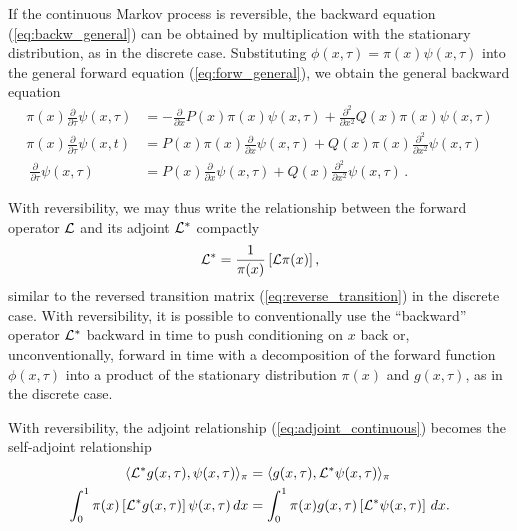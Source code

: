 \documentclass[preprint]{elsarticle}
\begin{document}
If the continuous Markov process is reversible, the backward equation (\ref{eq:backw_general}) can be obtained by multiplication with the stationary distribution, as in the discrete case. Substituting $\phi(x,\tau)=\pi(x)\psi(x,\tau)$ into the general forward equation (\ref{eq:forw_general}), we obtain the general backward equation
\begin{equation}
\begin{split}
\pi(x)\frac{\partial}{\partial \tau} \psi(x,\tau)&=-\frac{\partial}{\partial x}P(x)\pi(x)\psi(x,\tau)+\frac{\partial^2}{\partial x^2}Q(x)\pi(x) \psi(x,\tau)\\
\pi(x)\frac{\partial}{\partial \tau}\psi(x,t)&=P(x)\pi(x)\frac{\partial}{\partial x}\psi(x,\tau) +Q(x)\pi(x)\frac{\partial^2}{\partial x^2}\psi(x,\tau)\\\
\frac{\partial}{\partial \tau}\psi(x,\tau)&=P(x)\frac{\partial}{\partial x}\psi(x,\tau)+Q(x)\frac{\partial^2}{\partial x^2}\psi(x,\tau)\,.
\end{split}
\end{equation}

With reversibility, we may thus write the relationship between the forward operator ${\cal L}$ and its adjoint ${\cal L}^{*}$ compactly
\begin{equation}
{\cal L}^{*}=\frac1{\pi(x)}\left[{\cal L}\pi(x)\right],
\end{equation}
similar to the reversed transition matrix (\ref{eq:reverse_transition}) in the discrete case. With reversibility, it is possible to conventionally use the ``backward'' operator ${\cal L}^{*}$ backward in time to push conditioning on $x$ back or, unconventionally, forward in time with a decomposition of the forward function  $\phi(x,\tau)$ into a product of the stationary distribution $\pi(x)$ and $g(x,\tau)$, as in the discrete case.

With reversibility, the adjoint relationship (\ref{eq:adjoint_continuous}) becomes the self-adjoint relationship \citep{Song12}
\begin{equation}\label{eq:selfadjoint}
\begin{split}
\langle {\cal L}^{*} g(x,\tau),\psi(x,\tau) \rangle_{\pi}&=\langle g(x,\tau),{\cal L}^{*} \psi(x,\tau) \rangle_{\pi}\\
\int_0^1 \pi(x) \left[{\cal L}^{*} g(x,\tau)\right]\psi(x,\tau)\,dx&=
\int_0^1  \pi(x)g(x,\tau)\left[{\cal L}^{*} \psi(x,\tau)\right]\,dx.
\end{split}
\end{equation}
\end{document}
